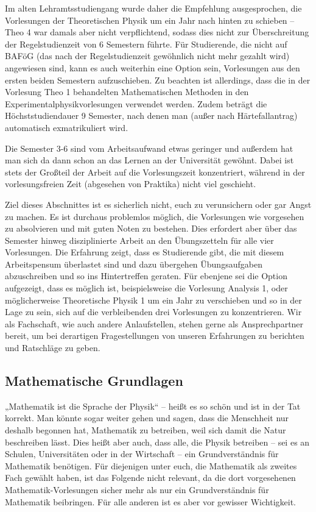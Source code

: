 Im alten Lehramtsstudiengang wurde daher die Empfehlung ausgesprochen, die Vorlesungen der Theoretischen Physik um ein Jahr nach hinten zu schieben -- Theo 4 war damals aber nicht verpflichtend, sodass dies nicht zur Überschreitung der Regelstudienzeit von 6 Semestern führte. Für Studierende, die nicht auf BAFöG (das nach der Regelstudienzeit gewöhnlich nicht mehr gezahlt wird) angewiesen sind, kann es auch weiterhin eine Option sein, Vorlesungen aus den ersten beiden Semestern aufzuschieben. Zu beachten ist allerdings, dass die in der Vorlesung Theo 1 behandelten Mathematischen Methoden in den Experimentalphysikvorlesungen verwendet werden. Zudem beträgt die Höchststudiendauer 9 Semester, nach denen man (außer nach Härtefallantrag) automatisch exmatrikuliert wird.

Die Semester 3-6 sind vom Arbeitsaufwand etwas geringer und außerdem hat man sich da dann schon an das Lernen an der Universität gewöhnt. Dabei ist stets der Großteil der Arbeit auf die Vorlesungszeit konzentriert, während in der vorlesungsfreien Zeit (abgesehen von Praktika) nicht viel geschieht.

Ziel dieses Abschnittes ist es sicherlich nicht, euch zu verunsichern oder gar Angst zu machen. Es ist durchaus problemlos möglich, die Vorlesungen wie vorgesehen zu absolvieren und mit guten Noten zu bestehen. Dies erfordert aber über das Semester hinweg disziplinierte Arbeit an den Übungszetteln für alle vier Vorlesungen. Die Erfahrung zeigt, dass es Studierende gibt, die mit diesem Arbeitspensum überlastet sind und dazu übergehen Übungsaufgaben abzuschreiben und so ins Hintertreffen geraten. Für ebenjene sei die Option aufgezeigt, dass es möglich ist, beispielsweise die Vorlesung Analysis 1, oder möglicherweise Theoretische Physik 1 um ein Jahr zu verschieben und so in der Lage zu sein, sich auf die verbleibenden drei Vorlesungen zu konzentrieren. Wir als Fachschaft, wie auch andere Anlaufstellen, stehen gerne als Ansprechpartner bereit, um bei derartigen Fragestellungen von unseren Erfahrungen zu berichten und Ratschläge zu geben.


\subsection{Mathematische Grundlagen}

„Mathematik ist die Sprache der Physik“ -- heißt es so schön und ist in der Tat korrekt. Man könnte sogar weiter gehen und sagen, dass die Menschheit nur deshalb begonnen hat, Mathematik zu betreiben, weil sich damit die Natur beschreiben lässt. Dies heißt aber auch, dass alle, die Physik betreiben -- sei es an Schulen, Universitäten oder in der Wirtschaft -- ein Grundverständnis für Mathematik benötigen. Für diejenigen unter euch, die Mathematik als zweites Fach gewählt haben, ist das Folgende nicht relevant, da die dort vorgesehenen Mathematik-Vorlesungen sicher mehr als nur ein Grundverständnis für Mathematik beibringen. Für alle anderen ist es aber vor gewisser Wichtigkeit.

